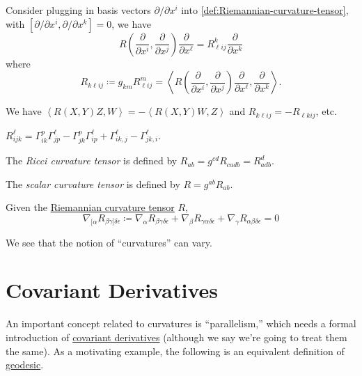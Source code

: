 Consider plugging in basis vectors \(\partial / \partial x^i\) into \autoref{def:Riemannian-curvature-tensor}, with \([\partial /\partial x^i, \partial / \partial x^k] = 0\), we have
\[
	R\left( \frac{\partial }{\partial x^i}, \frac{\partial }{\partial x^j} \right) \frac{\partial }{\partial x^{\ell } } = R^k_{\ell i j } \frac{\partial }{\partial x^k}
\]
where
\[
	R_{k \ell i j}
	\coloneqq g_{km}R^m_{\ell i j}
	= \left\langle R\left( \frac{\partial }{\partial x^i}, \frac{\partial }{\partial x^j} \right) \frac{\partial }{\partial x^{\ell } }, \frac{\partial }{\partial x^k}  \right\rangle.
\]

\begin{remark}
	We have \(\left\langle R(X, Y)Z, W \right\rangle = -\left\langle R(X, Y)W, Z \right\rangle\) and \(R_{k \ell i j} = -R_{\ell k i j}\), etc.
\end{remark}

\begin{remark}
	\(R^{\ell }_{ijk} = \Gamma _{ik}^p \Gamma ^\ell _{jp} - \Gamma ^p_{jk} \Gamma ^\ell _{ip} + \Gamma ^\ell _{ik, j} - \Gamma ^\ell _{jk, i}\).
\end{remark}

\begin{definition}\label{def:Ricci-curvature-tensor}
	The \emph{Ricci curvature tensor} is defined by \(R_{ab} = g^{cd}R_{cadb} = R^d_{adb}\).
\end{definition}

\begin{definition}\label{def:scalar-curvature-tensor}
	The \emph{scalar curvature tensor} is defined by \(R = g^{ab}R_{ab}\).
\end{definition}

\begin{proposition}
	Given the \hyperref[def:Riemannian-curvature-tensor]{Riemannian curvature tensor} \(R\),
	\[
		\nabla _{[\alpha} R_{\beta \gamma ]\delta \epsilon }
		\coloneqq \nabla _\alpha R_{\beta \gamma \delta \epsilon }
		+ \nabla _\beta R_{\gamma \alpha \delta \epsilon }
		+ \nabla _\gamma R_{\alpha \beta \delta \epsilon }
		= 0
	\]
\end{proposition}

We see that the notion of ``curvatures'' can vary.

\section{Covariant Derivatives}
An important concept related to curvatures is ``parallelism,'' which needs a formal introduction of \hyperref[def:covariant-derivative]{covariant derivatives} (although we say we're going to treat them the same). As a motivating example, the following is an equivalent definition of \hyperref[def:geodesic]{geodesic}.

